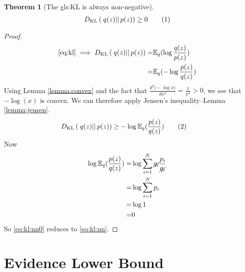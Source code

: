 \documentclass[]{article}
\newcommand{\Expectation} {\mathbb{E}}
\newcommand{\KLD}[2]{D_{\mathrm{KL}} \left( \left. \left. #1 \right|\right| #2 \right) }
\newcommand\numberthis    {\addtocounter{equation}{1}\tag{\theequation}}
\newtheorem{thm}{Theorem}
\begin{document}
\begin{thm}[The \gls{gls:KL} is always non-negative]\label{thm:kl:ge}
	\begin{align*}
		\KLD{q(z)}{p(z)} \ge 0 \numberthis \label{eq:kl:nn}
	\end{align*}
\end{thm}
\begin{proof}
	\begin{align*}
		\text{\eqref{eq:kl}}\implies\KLD{q(z)}{p(z)} = & \Expectation_q(\log{\frac{q(z)}{p(z)}})\\
        = & \Expectation_q(-\log{\frac{p(z)}{q(z)}})
	\end{align*}
	Using Lemma \ref{lemma:convex} and the fact that $\frac{d^2\big(-\log{x}\big)}{dx^2}=\frac{1}{x^2}>0$, we see that $-\log(x)$ is convex. We can therefore apply Jensen's inequality--Lemma \ref{lemma:jensen}.
	\begin{align*}
		\KLD{q(z)}{p(z)} \ge &-\log{\Expectation_q(\frac{p(z)}{q(z)})} \numberthis \label{eq:kl:nn0}
	\end{align*}
	Now
	\begin{align*}
		\log{\Expectation_q(\frac{p(z)}{q(z)})} =& \log{\sum_{i=1}^{N}\cancel{q_i}\frac{p_i}{\cancel{q_i}}}\\
		=& \log{\sum_{i=1}^{N}p_i}\\
		=& \log{1}\\
		=& 0
	\end{align*}
   So \eqref{eq:kl:nn0} reduces to \eqref{eq:kl:nn}.
\end{proof}

\section{Evidence Lower Bound}\label{sect:elbo}
\end{document}
